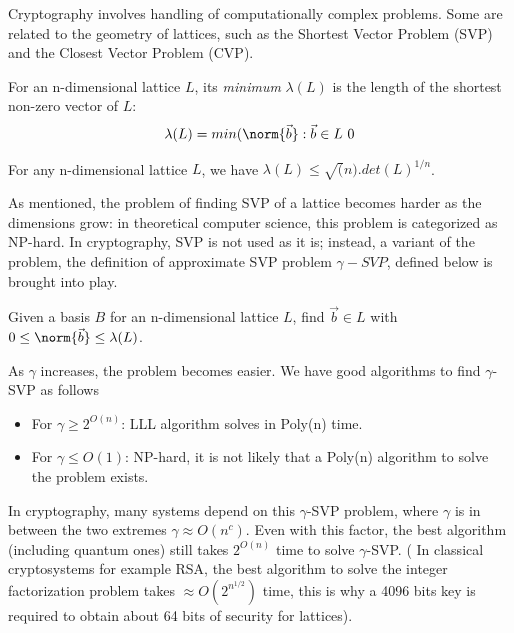 Cryptography involves handling of computationally complex problems. Some are related to the geometry of lattices, such as the Shortest
Vector Problem (SVP) and the Closest Vector Problem (CVP).
\begin{definition}
  For an n-dimensional lattice $L$, its \emph{minimum} $\lambda(L)$ is the
  length of the shortest non-zero vector of $L$:
  \[
    \lambda(L) = min(\norm{\vec{b}}: \vec{b} \in L \ 0
  \]
  \label{def:minLattice}
\end{definition}
\begin{theorem}
   For any n-dimensional lattice $L$, we have
  $\lambda(L) \leq \sqrt(n).det(L)^{1/n}$.
  \label{the:minkowski1}
\end{theorem}
As mentioned, the problem of finding SVP of a lattice becomes harder as the dimensions
grow: in theoretical computer science, this problem is categorized as
NP-hard. In cryptography, SVP is not used as it is; instead, a variant of the
problem, the definition of approximate SVP problem $\gamma-SVP$, defined below is brought into play.
\begin{definition}
   Given a basis $B$ for an n-dimensional lattice $L$,
  find $\vec{b} \in L$ with $0 \leq \norm{\vec{b}} \leq \lambda(L)$.
  \label{def:gammaSVP}
\end{definition}
As $\gamma$ increases, the problem becomes easier. We have good algorithms to
find $\gamma$-SVP as follows
\begin{itemize}
\item For $\gamma \geq 2^{O(n)}$: LLL algorithm solves in Poly(n) time.
\item For $\gamma \leq O(1)$: NP-hard, it is not likely that a Poly(n) algorithm to solve the problem exists.
\end{itemize}
In cryptography, many systems depend on this $\gamma$-SVP problem, where
$\gamma$ is in between the two extremes $\gamma \approx O(n^c)$. Even with this
factor, the best algorithm (including quantum ones) still takes $2^{O(n)}$ time
to solve $\gamma$-SVP. ( In classical cryptosystems for example RSA, the best
algorithm to solve the integer factorization problem takes
$\approx O(2^{n^{1/2}})$ time, this is why a 4096 bits key is required to obtain
about 64 bits of security for lattices).

